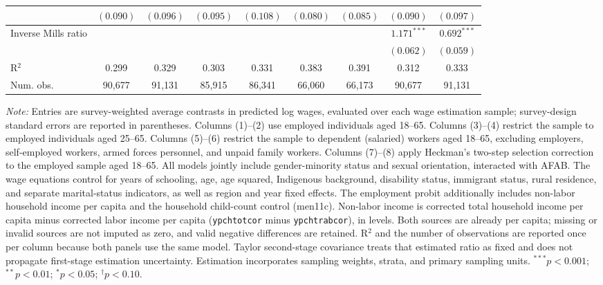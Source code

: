 \begin{table}[htpb]
{\begin{tabular}{l c c c c c c c c}
 & $(0.090)$ & $(0.096)$ & $(0.095)$ & $(0.108)$ & $(0.080)$ & $(0.085)$ & $(0.090)$ & $(0.097)$ \\
\hline
Inverse Mills ratio &  &  &  &  &  &  & $1.171^{***}$ & $0.692^{***}$ \\
 &  &  &  &  &  &  & $(0.062)$ & $(0.059)$ \\
\hline
R$^2$ & 0.299 & 0.329 & 0.303 & 0.331 & 0.383 & 0.391 & 0.312 & 0.333 \\
Num. obs. & 90,677 & 91,131 & 85,915 & 86,341 & 66,060 & 66,173 & 90,677 & 91,131 \\
\hline
\end{tabular}%
}
\par\smallskip
\begin{minipage}{\textwidth}\footnotesize
\footnotesize\textit{Note:} Entries are survey-weighted average contrasts in predicted log wages, evaluated over each wage estimation sample; survey-design standard errors are reported in parentheses. Columns (1)--(2) use employed individuals aged 18--65. Columns (3)--(4) restrict the sample to employed individuals aged 25--65. Columns (5)--(6) restrict the sample to dependent (salaried) workers aged 18--65, excluding employers, self-employed workers, armed forces personnel, and unpaid family workers. Columns (7)--(8) apply Heckman's two-step selection correction to the employed sample aged 18--65. All models jointly include gender-minority status and sexual orientation, interacted with AFAB. The wage equations control for years of schooling, age, age squared, Indigenous background, disability status, immigrant status, rural residence, and separate marital-status indicators, as well as region and year fixed effects. The employment probit additionally includes non-labor household income per capita and the household child-count control (men11c). Non-labor income is corrected total household income per capita minus corrected labor income per capita (\texttt{ypchtotcor} minus \texttt{ypchtrabcor}), in levels. Both sources are already per capita; missing or invalid sources are not imputed as zero, and valid negative differences are retained. R$^2$ and the number of observations are reported once per column because both panels use the same model. Taylor second-stage covariance treats that estimated ratio as fixed and does not propagate first-stage estimation uncertainty. Estimation incorporates sampling weights, strata, and primary sampling units. $^{***}p<0.001$; $^{**}p<0.01$; $^{*}p<0.05$; $^{\dagger}p<0.10$.
\end{minipage}
\end{table}
